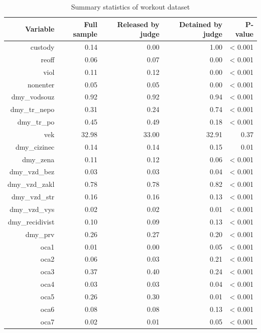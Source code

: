 \documentclass[12pt, twoside]{book} %
\begin{document}
\begin{table}[H]
\centering
\begin{tabular}{rrrrr}
  \hline
Variable & Full sample & Released by judge & Detained by judge & P-value \\ 
  \hline
custody & 0.14 & 0.00 & 1.00 & < 0.001 \\ 
  reoff & 0.06 & 0.07 & 0.00 & < 0.001 \\ 
  viol & 0.11 & 0.12 & 0.00 & < 0.001 \\ 
  nonenter & 0.05 & 0.05 & 0.00 & < 0.001 \\ 
  dmy\_vodsouz & 0.92 & 0.92 & 0.94 & < 0.001 \\ 
  dmy\_tr\_nepo & 0.31 & 0.24 & 0.74 & < 0.001 \\ 
  dmy\_tr\_po & 0.45 & 0.49 & 0.18 & < 0.001 \\ 
  vek & 32.98 & 33.00 & 32.91 & 0.37 \\ 
  dmy\_cizinec & 0.14 & 0.14 & 0.15 & 0.01 \\ 
  dmy\_zena & 0.11 & 0.12 & 0.06 & < 0.001 \\ 
  dmy\_vzd\_bez & 0.03 & 0.03 & 0.04 & < 0.001 \\ 
  dmy\_vzd\_zakl & 0.78 & 0.78 & 0.82 & < 0.001 \\ 
  dmy\_vzd\_str & 0.16 & 0.16 & 0.13 & < 0.001 \\ 
  dmy\_vzd\_vys & 0.02 & 0.02 & 0.01 & < 0.001 \\ 
  dmy\_recidivist & 0.10 & 0.09 & 0.13 & < 0.001 \\ 
  dmy\_prv & 0.26 & 0.27 & 0.20 & < 0.001 \\ 
  oca1 & 0.01 & 0.00 & 0.05 & < 0.001 \\ 
  oca2 & 0.06 & 0.03 & 0.21 & < 0.001 \\ 
  oca3 & 0.37 & 0.40 & 0.24 & < 0.001 \\ 
  oca4 & 0.03 & 0.03 & 0.04 & < 0.001 \\ 
  oca5 & 0.26 & 0.30 & 0.01 & < 0.001 \\ 
  oca6 & 0.08 & 0.08 & 0.13 & < 0.001 \\ 
  oca7 & 0.02 & 0.01 & 0.05 & < 0.001 \\ 
   \hline
\end{tabular}

 \caption{Summary statistics of workout dataset}
\medskip
{\small {}}

\end{table}
\end{document}
